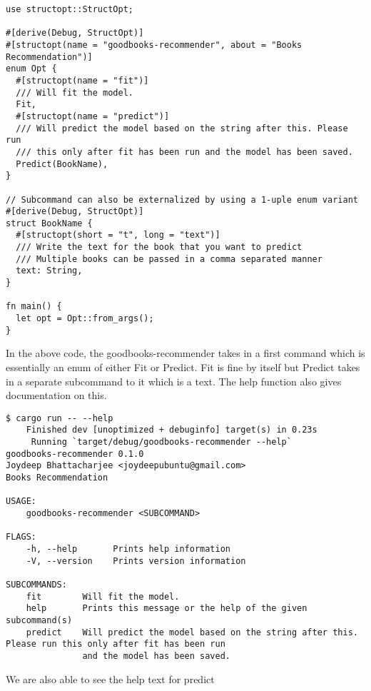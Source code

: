 \documentclass{book}
\begin{document}
\begin{lstlisting}[caption={goodbooks-recommender/src/main.rs}, basicstyle=\small]
use structopt::StructOpt;

#[derive(Debug, StructOpt)]
#[structopt(name = "goodbooks-recommender", about = "Books Recommendation")]
enum Opt {
  #[structopt(name = "fit")]
  /// Will fit the model.
  Fit,
  #[structopt(name = "predict")]
  /// Will predict the model based on the string after this. Please run
  /// this only after fit has been run and the model has been saved.
  Predict(BookName),
}

// Subcommand can also be externalized by using a 1-uple enum variant
#[derive(Debug, StructOpt)]
struct BookName {
  #[structopt(short = "t", long = "text")]
  /// Write the text for the book that you want to predict
  /// Multiple books can be passed in a comma separated manner
  text: String,
}

fn main() {
  let opt = Opt::from_args();    
}
\end{lstlisting}

In the above code, the goodbooks-recommender takes in a first command which is essentially an enum of either Fit or Predict. Fit is fine by itself but Predict takes in a separate subcommand to it which is a text. The help function also gives documentation on this.

\begin{lstlisting}[caption={}, basicstyle=\tiny]
$ cargo run -- --help
    Finished dev [unoptimized + debuginfo] target(s) in 0.23s
     Running `target/debug/goodbooks-recommender --help`
goodbooks-recommender 0.1.0
Joydeep Bhattacharjee <joydeepubuntu@gmail.com>
Books Recommendation

USAGE:
    goodbooks-recommender <SUBCOMMAND>

FLAGS:
    -h, --help       Prints help information
    -V, --version    Prints version information

SUBCOMMANDS:
    fit        Will fit the model.
    help       Prints this message or the help of the given subcommand(s)
    predict    Will predict the model based on the string after this. Please run this only after fit has been run
               and the model has been saved.
\end{lstlisting}

We are also able to see the help text for predict
\end{document}
